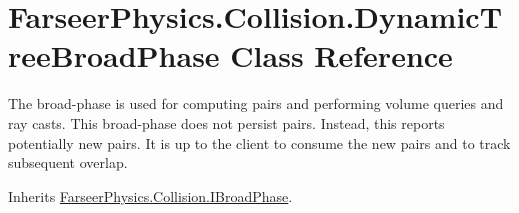 \hypertarget{class_farseer_physics_1_1_collision_1_1_dynamic_tree_broad_phase}{\section{Farseer\+Physics.\+Collision.\+Dynamic\+Tree\+Broad\+Phase Class Reference}
\label{class_farseer_physics_1_1_collision_1_1_dynamic_tree_broad_phase}
}


The broad-\/phase is used for computing pairs and performing volume queries and ray casts. This broad-\/phase does not persist pairs. Instead, this reports potentially new pairs. It is up to the client to consume the new pairs and to track subsequent overlap.  




Inherits \hyperlink{interface_farseer_physics_1_1_collision_1_1_i_broad_phase}{Farseer\+Physics.\+Collision.\+I\+Broad\+Phase}.

